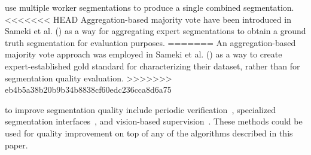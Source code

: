  use multiple worker segmentations to produce a single combined segmentation. %
<<<<<<< HEAD
Aggregation-based majority vote have been introduced in Sameki et al. (\citeyear{Sameki2015}) as a way for aggregating expert segmentations to obtain a ground truth segmentation for evaluation purposes. 
=======
An aggregation-based majority vote approach was employed in Sameki et al. (\citeyear{Sameki2015}) as a way to create expert-established gold standard for characterizing their dataset, rather than for segmentation quality evaluation. 
>>>>>>> eb4b5a38b20b9b34b8838cf60edc236cca8d6a75

 to improve segmentation quality include periodic verification~\cite{Lin2014,Everingham15}, specialized segmentation interfaces~\cite{Song2018}, and vision-based supervision~\cite{Russakovsky2015,Gurari2016}. These methods could be used for quality improvement on top of any of the algorithms described in this paper.  %

